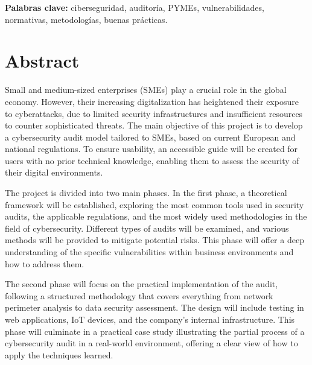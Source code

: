 \documentclass[a4paper, 10pt]{article}
\begin{document}
\par\vspace{0.5cm}
\textbf{Palabras clave:} ciberseguridad, auditoría, PYMEs, vulnerabilidades, normativas, metodologías, buenas prácticas.
\clearpage


\section*{Abstract}
\thispagestyle{empty}
Small and medium-sized enterprises (SMEs) play a crucial role in the global economy. However, their increasing digitalization has heightened their exposure to cyberattacks, due to limited security infrastructures and insufficient resources to counter sophisticated threats.
The main objective of this project is to develop a cybersecurity audit model tailored to SMEs, based on current European and national regulations. To ensure usability, an accessible guide will be created for users with no prior technical knowledge, enabling them to assess the security of their digital environments.
\par\vspace{0.5cm}

The project is divided into two main phases. In the first phase, a theoretical framework will be established, exploring the most common tools used in security audits, the applicable regulations, and the most widely used methodologies in the field of cybersecurity. Different types of audits will be examined, and various methods will be provided to mitigate potential risks. This phase will offer a deep understanding of the specific vulnerabilities within business environments and how to address them.
\par\vspace{0.5cm}

The second phase will focus on the practical implementation of the audit, following a structured methodology that covers everything from network perimeter analysis to data security assessment.
The design will include testing in web applications, IoT devices, and the company's internal infrastructure.
This phase will culminate in a practical case study illustrating the partial process of a cybersecurity audit in a real-world environment, offering a clear view of how to apply the techniques learned.
\par\vspace{0.5cm}
\end{document}
